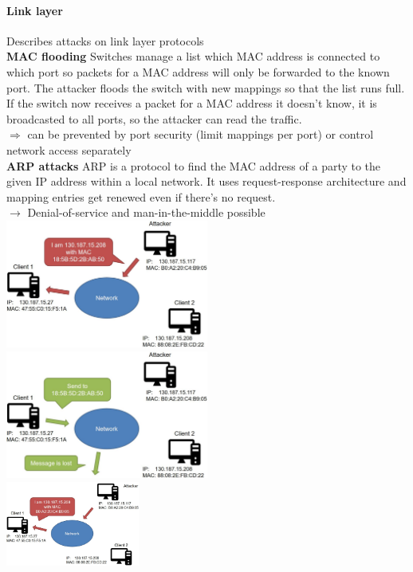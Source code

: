 \documentclass[12pt]{article}
\begin{document}
	\paragraph{Link layer} Describes attacks on link layer protocols\\
	\textbf{MAC flooding} Switches manage a list which MAC address is connected to which port so packets for a MAC address will only be forwarded to the known port. The attacker floods the switch with new mappings so that the list runs full. If the switch now receives a packet for a MAC address it doesn't know, it is broadcasted to all ports, so the attacker can read the traffic.\\
	$\Rightarrow$ can be prevented by port security (limit mappings per port) or control network access separately\\
	\textbf{ARP attacks} ARP is a protocol to find the MAC address of a party to the given IP address within a local network. It uses request-response architecture and mapping entries get renewed even if there's no request.\\
	$\rightarrow$ Denial-of-service and man-in-the-middle possible\\
	\includegraphics[width=0.5\textwidth]{figures/arp-dos1.JPG}
	\includegraphics[width=0.5\textwidth]{figures/arp-dos2.JPG}\\
	\includegraphics[width=0.33\textwidth]{figures/arp-mitm1.JPG}
\end{document}
